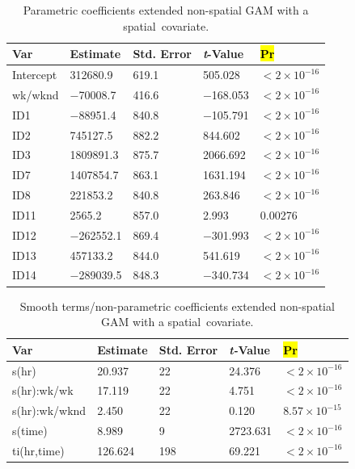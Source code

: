 \documentclass[energies,article,accept,pdftex,moreauthors]{Definitions/mdpi}
\begin{document}
    \begin{table}[H] 
    \caption{Parametric coefficients extended non-spatial GAM with a spatial~covariate.\label{tab9}}
    \begin{tabularx}{\textwidth}{CCCCC}
    \toprule
    \textbf{Var} & \textbf{Estimate} & \textbf{Std. Error}  & \textbf{\emph{t}-Value} & \textbf{\hl{Pr} %
}\\
    \midrule
    Intercept & 312680.9 & 619.1 & 505.028 & $<2 \times 10^{-16}$\\
    wk/wknd & $-$70008.7 & 416.6 & $-$168.053 & $<2 \times 10^{-16}$\\
    ID1 & $-$88951.4 & 840.8 & $-$105.791 & $<2 \times 10^{-16}$\\
    ID2 & 745127.5 & 882.2 & 844.602 & $<2 \times 10^{-16}$\\
    ID3 & 1809891.3 & 875.7 & 2066.692 &  $<2 \times 10^{-16}$\\
    ID7 & 1407854.7 & 863.1 & 1631.194 & $<2 \times 10^{-16}$\\
    ID8 & 221853.2 & 840.8 & 263.846 & $<2 \times 10^{-16}$\\
    ID11 & 2565.2 & 857.0 & 2.993 & 0.00276\\
    ID12 & $-$262552.1 & 869.4 & $-$301.993 & $<2 \times 10^{-16}$\\
    ID13 & 457133.2 & 844.0 & 541.619 & $<2 \times 10^{-16}$\\
    ID14 & $-$289039.5 & 848.3 & $-$340.734 & $<2 \times 10^{-16}$\\
    \bottomrule
    \end{tabularx}
    \end{table}
\unskip

    \begin{table}[H] 
    \caption{Smooth terms/non-parametric coefficients extended non-spatial GAM with a spatial~covariate.\label{tab10}}
    \begin{tabularx}{\textwidth}{CCCCC}
    \toprule
    \textbf{Var} & \textbf{Estimate} & \textbf{Std. Error}  & \textbf{\emph{t-}Value} & \textbf{\hl{Pr} %
}\\
    \midrule
    s(hr) & 20.937 & 22 & 24.376 & $<2 \times 10^{-16}$\\
    s(hr):wk/wk & 17.119 & 22 & 4.751 & $<2 \times 10^{-16}$\\
    s(hr):wk/wknd & 2.450 & 22 & 0.120 & $8.57 \times 10^{-15}$\\
    s(time) & 8.989 & 9 & 2723.631 & $<2 \times 10^{-16}$\\
    ti(hr,time) & 126.624 & 198 & 69.221 & $<2 \times 10^{-16}$\\
    \bottomrule
    \end{tabularx}
    \end{table}
\unskip
\end{document}
